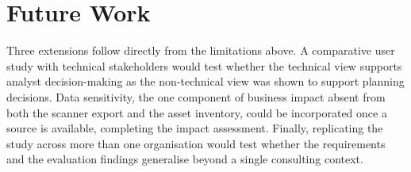 \section{Future Work}

Three extensions follow directly from the limitations above. A comparative user study with technical stakeholders would test whether the technical view supports analyst decision-making as the non-technical view was shown to support planning decisions. Data sensitivity, the one component of business impact absent from both the scanner export and the asset inventory, could be incorporated once a source is available, completing the impact assessment. Finally, replicating the study across more than one organisation would test whether the requirements and the evaluation findings generalise beyond a single consulting context.


